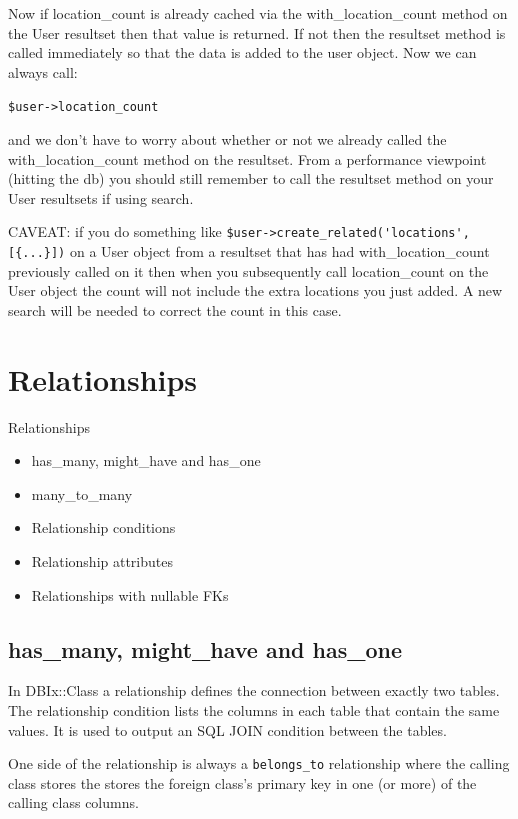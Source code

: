 Now if location\_count is already cached via the with\_location\_count
method on the User resultset then that value is returned. If not then the
resultset method is called immediately so that the data is added to the user
object. Now we can always call:

\verb|$user->location_count|

and we don't have to worry about whether or not we already called the
with\_location\_count method on the resultset. From a performance viewpoint
(hitting the db) you should still remember to call the resultset method on
your User resultsets if using search. 

CAVEAT: if you do something like 
\verb|$user->create_related('locations', [{...}])|
on a User object from a resultset that has had with\_location\_count
previously called on it then when you subsequently call location\_count on
the User object the count will not include the extra locations you just
added. A new search will be needed to correct the count in this case.

\section{Relationships}

\begin{frame}{Relationships}
\begin{itemize}
\item has\_many, might\_have and has\_one
\item many\_to\_many
\item Relationship conditions
\item Relationship attributes
\item Relationships with nullable FKs
\end{itemize}
\end{frame}

\subsection{has\_many, might\_have and has\_one}

In DBIx::Class a relationship defines the connection between exactly two
tables. The relationship condition lists the columns in each table that
contain the same values. It is used to output an SQL JOIN condition between
the tables.

One side of the relationship is always a \verb|belongs_to| relationship
where the calling class stores the stores the foreign class’s primary key in
one (or more) of the calling class columns.

